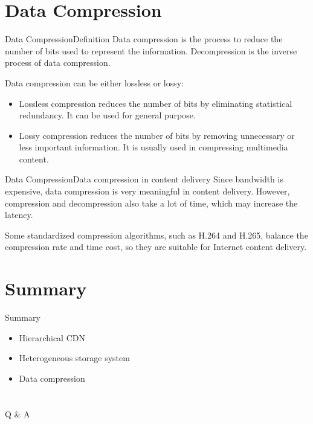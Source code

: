 \documentclass{beamer}
\begin{document}
  \section{Data Compression}
  \begin{frame}{Data Compression}{Definition}
    Data compression is the process to reduce the number of bits used to represent the information. Decompression is the inverse process of data compression. \par
    \pause
    Data compression can be either lossless or lossy:
    \begin{itemize}
      \item Lossless compression reduces the number of bits by eliminating statistical redundancy. It can be used for general purpose.
      \item Lossy compression reduces the number of bits by removing unnecessary or less important information. It is usually used in compressing multimedia content.
    \end{itemize}
  \end{frame}
  
  \begin{frame}{Data Compression}{Data compression in content delivery}
    Since bandwidth is expensive, data compression is very meaningful in content delivery. However, compression and decompression also take a lot of time, which may increase the latency. \par
    \pause
    Some standardized compression algorithms, such as H.264 and H.265, balance the compression rate and time cost, so they are suitable for Internet content delivery.
  \end{frame}
  
  \section{Summary}
  \begin{frame}{Summary}
    \begin{itemize}
      \item Hierarchical CDN
      \item Heterogeneous storage system
      \item Data compression
    \end{itemize}
  \end{frame}
  
  \section{}
  \begin{frame}{Q \& A}

  \end{frame}
\end{document}
